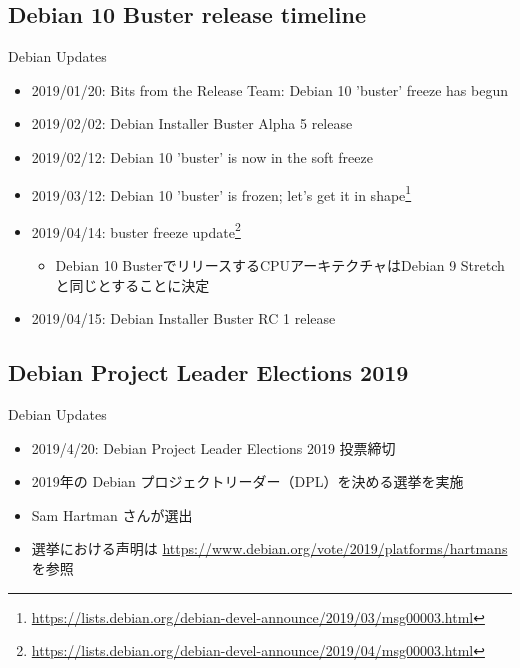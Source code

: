 \subsection{Debian 10 Buster release timeline}

\begin{frame}{Debian Updates}%

\begin{itemize}
  \item 2019/01/20: Bits from the Release Team: Debian 10 'buster' freeze has begun
  \item 2019/02/02: Debian Installer Buster Alpha 5 release
  \item 2019/02/12: Debian 10 'buster' is now in the soft freeze
  \item 2019/03/12: Debian 10 'buster' is frozen; let's get it in shape\footnote{\url{https://lists.debian.org/debian-devel-announce/2019/03/msg00003.html}}
  \item 2019/04/14: buster freeze update\footnote{\url{https://lists.debian.org/debian-devel-announce/2019/04/msg00003.html}}
    \begin{itemize}
      \item Debian 10 BusterでリリースするCPUアーキテクチャはDebian 9 Stretchと同じとすることに決定
    \end{itemize}
  \item 2019/04/15: Debian Installer Buster RC 1 release
\end{itemize}

\end{frame}


\subsection{Debian Project Leader Elections 2019}

\begin{frame}{Debian Updates}%

  \begin{itemize}
 
\item 2019/4/20: Debian Project Leader Elections 2019 投票締切
\item 2019年の Debian プロジェクトリーダー（DPL）を決める選挙を実施
\item Sam Hartman さんが選出
\item 選挙における声明は \url{https://www.debian.org/vote/2019/platforms/hartmans} を参照
\end{itemize}

\end{frame}


